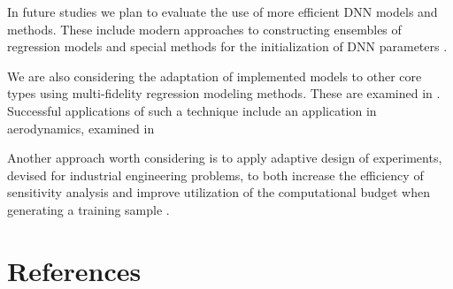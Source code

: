 \documentclass[review]{elsarticle}
\begin{document}
In future studies we plan to evaluate the use of more efficient DNN models and methods. These include modern approaches to constructing ensembles of regression models \cite{burnaev2013method} and special methods for the initialization of DNN parameters \cite{burnaev2016influence}.

We are also considering the adaptation of implemented models to other core types using multi-fidelity regression modeling methods. These are examined in \cite{zaytsev2017minimax,zaytsev2017large,burnaev2015surrogate}. Successful applications of such a technique include an application in aerodynamics, examined in \cite{belyaev2014building}

Another approach worth considering is to apply adaptive design of experiments, devised for industrial engineering problems, to both increase the efficiency of sensitivity analysis and improve utilization of the computational budget when generating a training sample \cite{burnaev2017efficient,burnaev2015adaptive}.

\section*{References}


\end{document}
